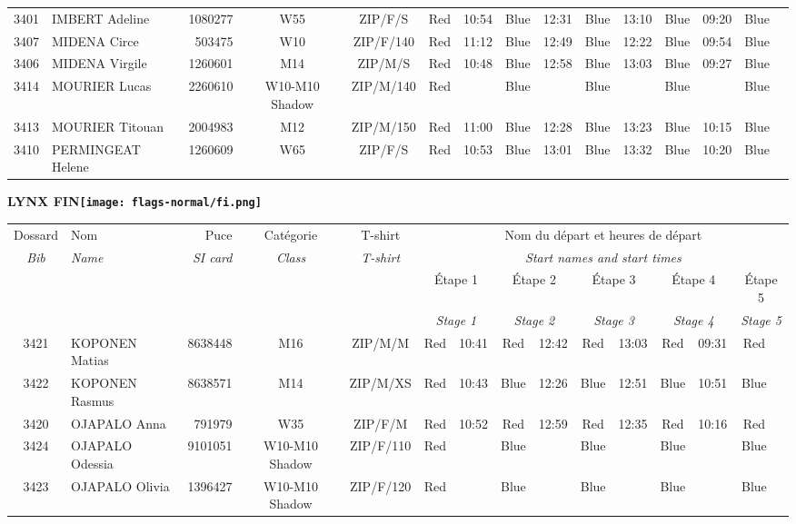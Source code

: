\documentclass{report}
\begin{document}
\begin{longtable}{|c|l|r|c|c|*{5}{cc|}}
    3401 & IMBERT Adeline & 1080277 & W55 & ZIP/F/S & Red & 10:54 & Blue & 12:31 & Blue & 13:10 & Blue & 09:20 & Blue &  \\
    3407 & MIDENA Circe & 503475 & W10 & ZIP/F/140 & Red & 11:12 & Blue & 12:49 & Blue & 12:22 & Blue & 09:54 & Blue &  \\
    3406 & MIDENA Virgile & 1260601 & M14 & ZIP/M/S & Red & 10:48 & Blue & 12:58 & Blue & 13:03 & Blue & 09:27 & Blue &  \\
    3414 & MOURIER Lucas & 2260610 & W10-M10 Shadow & ZIP/M/140 & Red &   & Blue &   & Blue &   & Blue &   & Blue &  \\
    3413 & MOURIER Titouan & 2004983 & M12 & ZIP/M/150 & Red & 11:00 & Blue & 12:28 & Blue & 13:23 & Blue & 10:15 & Blue &  \\
    3410 & PERMINGEAT Helene & 1260609 & W65 & ZIP/F/S & Red & 10:53 & Blue & 13:01 & Blue & 13:32 & Blue & 10:20 & Blue &  \\
  \end{longtable}
\newpage
  \Huge \centering \bfseries LYNX  FIN\normalfont \footnotesize \sffamily \hfill \texttt{[image: flags-normal/fi.png]} \newline 
  \begin{longtable}{|c|l|r|c|c|*{5}{cc|}}
    Dossard & Nom  & Puce    & Catégorie & T-shirt & \multicolumn{10}{c|}{Nom du départ et heures de départ} \\
    \itshape Bib     & \itshape Name & \itshape SI card & \itshape Class  & \itshape  T-shirt  & \multicolumn{10}{c|}{\itshape Start names and start times} \\
    \hline
    & & & & & \multicolumn{2}{c|}{Étape 1} & \multicolumn{2}{c|}{Étape 2} & \multicolumn{2}{c|}{Étape 3} & \multicolumn{2}{c|}{Étape 4} & \multicolumn{2}{c|}{Étape 5} \\
    & & & & & \multicolumn{2}{c|}{\itshape Stage 1} & \multicolumn{2}{c|}{\itshape Stage 2} & \multicolumn{2}{c|}{\itshape Stage 3} & \multicolumn{2}{c|}{\itshape Stage 4} & \multicolumn{2}{c|}{\itshape Stage 5} \\
    \hline
    3421 & KOPONEN Matias & 8638448 & M16 & ZIP/M/M & Red & 10:41 & Red & 12:42 & Red & 13:03 & Red & 09:31 & Red &  \\
    3422 & KOPONEN Rasmus & 8638571 & M14 & ZIP/M/XS & Red & 10:43 & Blue & 12:26 & Blue & 12:51 & Blue & 10:51 & Blue &  \\
    3420 & OJAPALO Anna & 791979 & W35 & ZIP/F/M & Red & 10:52 & Red & 12:59 & Red & 12:35 & Red & 10:16 & Red &  \\
    3424 & OJAPALO Odessia & 9101051 & W10-M10 Shadow & ZIP/F/110 & Red &   & Blue &   & Blue &   & Blue &   & Blue &  \\
    3423 & OJAPALO Olivia & 1396427 & W10-M10 Shadow & ZIP/F/120 & Red &   & Blue &   & Blue &   & Blue &   & Blue &  \\
  \end{longtable}
\end{document}
